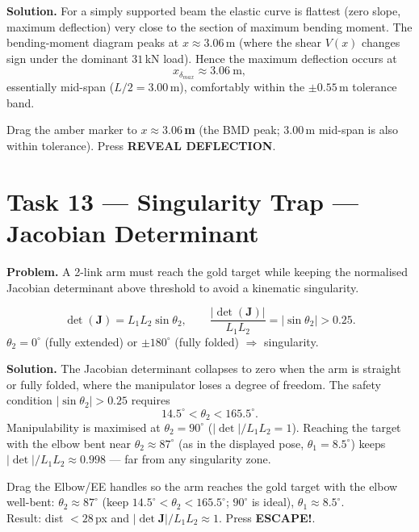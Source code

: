 \documentclass[11pt]{article}
\newcommand{\task}[2]{\section{Task #1 --- #2}}
\begin{document}
\textbf{Solution.} For a simply supported beam the elastic curve is flattest
(zero slope, maximum deflection) very close to the section of maximum bending
moment. The bending-moment diagram peaks at $x\approx3.06$\,m
(where the shear $V(x)$ changes sign under the dominant $31$\,kN load).
Hence the maximum deflection occurs at
\[
x_{\delta_{max}}\approx3.06\ \text{m},
\]
essentially mid-span ($L/2=3.00$\,m), comfortably within the $\pm0.55$\,m
tolerance band.

\begin{answer}
Drag the amber marker to \textbf{$x \approx 3.06$\,m}
(the BMD peak; $3.00$\,m mid-span is also within tolerance).
Press \textbf{REVEAL DEFLECTION}.
\end{answer}

\task{13}{Singularity Trap --- Jacobian Determinant}
\textbf{Problem.} A 2-link arm must reach the gold target while keeping the
normalised Jacobian determinant above threshold to avoid a kinematic
singularity.

\begin{relbox}
\[
\det(\mathbf J)=L_1 L_2\sin\theta_2,\qquad
\frac{|\det(\mathbf J)|}{L_1 L_2}=|\sin\theta_2|>0.25 .
\]
$\theta_2=0^{\circ}$ (fully extended) or $\pm180^{\circ}$ (fully folded) $\Rightarrow$ singularity.
\end{relbox}

\textbf{Solution.} The Jacobian determinant collapses to zero when the arm is
straight or fully folded, where the manipulator loses a degree of freedom.
The safety condition $|\sin\theta_2|>0.25$ requires
\[
14.5^{\circ}<\theta_2<165.5^{\circ}.
\]
Manipulability is maximised at $\theta_2=90^{\circ}$ ($|\det|/L_1L_2=1$).
Reaching the target with the elbow bent near $\theta_2\approx87^{\circ}$
(as in the displayed pose, $\theta_1=8.5^{\circ}$) keeps
$|\det|/L_1L_2\approx0.998$ --- far from any singularity zone.

\begin{answer}
Drag the Elbow/EE handles so the arm reaches the gold target with the elbow
well-bent: \textbf{$\theta_2\approx87^{\circ}$} (keep $14.5^{\circ}<\theta_2<165.5^{\circ}$;
$90^{\circ}$ is ideal), $\theta_1\approx8.5^{\circ}$.\\
Result: dist $<28$\,px and $|\det \mathbf J|/L_1L_2\approx1$. Press \textbf{ESCAPE!}.
\end{answer}
\end{document}
